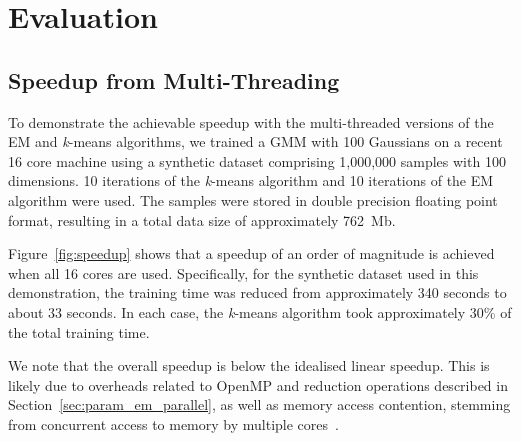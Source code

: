 \documentclass[10pt,a4paper]{article}
\begin{document}
\clearpage
\section{Evaluation}
\label{sec:eval}

\subsection{Speedup from Multi-Threading}

To demonstrate the achievable speedup with the multi-threaded versions of the EM and {\it k}-means algorithms,
we trained a GMM with 100 Gaussians on a recent 16 core machine using a synthetic dataset comprising 1,000,000 samples with 100 dimensions.
10 iterations of the {\it k}-means algorithm and 10 iterations of the EM algorithm were used.
The samples were stored in double precision floating point format, resulting in a total data size of approximately 762~Mb.

Figure~\ref{fig:speedup} shows that a speedup of an order of magnitude is achieved when all 16 cores are used.
Specifically, for the synthetic dataset used in this demonstration,
the training time was reduced from approximately 340 seconds to about 33 seconds.
In each case, the {\it k}-means algorithm took approximately 30\% of the total training time.

We note that the overall speedup is below the idealised linear speedup.
This is likely due to overheads related to OpenMP and reduction operations described in Section~\ref{sec:param_em_parallel},
as well as memory access contention, stemming from concurrent access to memory by multiple cores~\cite{McCool_2012}.
\end{document}
